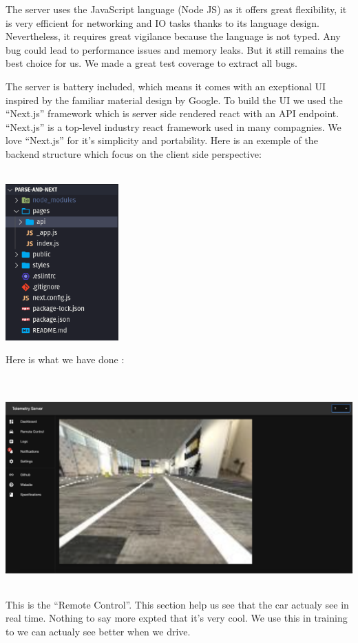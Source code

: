 \documentclass[12pt]{article}
\begin{document}
The server uses the JavaScript language (Node JS) as it offers great flexibility, it is very efficient for networking and IO tasks thanks to its language design. Nevertheless, it requires great vigilance because the language is not typed. Any bug could lead to performance issues and memory leaks. But it still remains the best choice for us. We made a great test coverage to extract all bugs. \\

\newpage

The server is battery included, which means it comes with an exeptional UI inspired by the familiar material design by Google. To build the UI we used the “Next.js” framework which is server side rendered react with an API endpoint. “Next.js” is a top-level industry react framework used in many compagnies. We love “Next.js” for it’s simplicity and portability. Here is an exemple of the backend structure which focus on the client side perspective: \\ \\
\centerline{\includegraphics[height=6cm]{../../docs/server-struct.png}}

Here is what we have done : \\ \\
\centerline{\includegraphics[height=7.5cm]{../../docs/remote-control.png}}
This is the “Remote Control”. This section help us see that the car actualy see in real time. Nothing to say more expted that it’s very cool. We use this in training to we can actualy see better when we drive. \\
\end{document}
